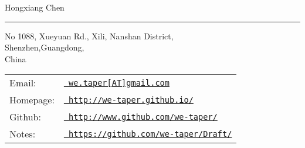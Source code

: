 \documentclass[letterpaper]{article}
\def\name{Hongxiang Chen}
\begin{document}
{\huge \name}
\vspace{+8pt}
\hrule height .7pt
\smallskip

\vspace{0.15in}

\begin{minipage}{0.44\linewidth}
  No 1088, Xueyuan Rd., Xili, Nanshan District,\\
  Shenzhen,Guangdong,\\
  China \\
\end{minipage}
\begin{minipage}{0.55\linewidth}
  \begin{tabular}{ll}
  Email: & \href{mailto:we.taper[at]gmail.com}{\tt
we.taper[AT]gmail.com} \\
    Homepage: & \href{http://we-taper.github.io/}{\tt
http://we-taper.github.io/} \\
    Github: & \href{http://www.github.com/we-taper/}{\tt
http://www.github.com/we-taper/} \\
    Notes: & \href{https://github.com/we-taper/Draft/}{\tt
https://github.com/we-taper/Draft/} \\
  \end{tabular}
\end{minipage}
\end{document}
